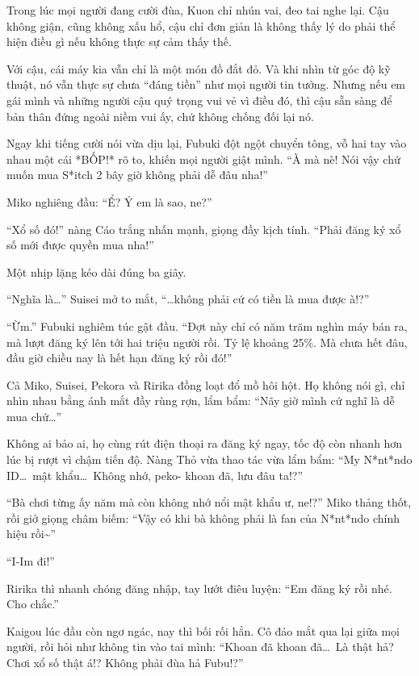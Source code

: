 \documentclass[../main.tex]{subfiles}
\begin{document}
Trong lúc mọi người đang cười đùa, Kuon chỉ nhún vai, đeo tai nghe lại. Cậu không giận, cũng không xấu hổ, cậu chỉ đơn giản là không thấy lý do phải thể hiện điều gì nếu không thực sự cảm thấy thế.

Với cậu, cái máy kia vẫn chỉ là một món đồ đắt đỏ. Và khi nhìn từ góc độ kỹ thuật, nó vẫn thực sự chưa ``đáng tiền'' như mọi người tin tưởng. Nhưng nếu em gái mình và những người cậu quý trọng vui vẻ vì điều đó, thì cậu sẵn sàng để bản thân đứng ngoài niềm vui ấy, chứ không chống đối lại nó.

Ngay khi tiếng cười nói vừa dịu lại, Fubuki đột ngột chuyển tông, vỗ hai tay vào nhau một cái *BỐP!* rõ to, khiến mọi người giật mình. ``À mà nè! Nói vậy chứ muốn mua S*itch 2 bây giờ không phải dễ đâu nha!''

Miko nghiêng đầu: ``Ể? Ý em là sao, ne?''

``Xổ số đó!'' nàng Cáo trắng nhấn mạnh, giọng đầy kịch tính. ``Phải đăng ký xổ số mới được quyền mua nha!''

Một nhịp lặng kéo dài đúng ba giây.

``Nghĩa là\dots'' Suisei mở to mắt, ``\dots không phải cứ có tiền là mua được à!?''

``Ừm.'' Fubuki nghiêm túc gật đầu. ``Đợt này chỉ có năm trăm nghìn máy bán ra, mà lượt đăng ký lên tới hai triệu người rồi. Tỷ lệ khoảng 25\%. Mà chưa hết đâu, đầu giờ chiều nay là hết hạn đăng ký rồi đó!''

Cả Miko, Suisei, Pekora và Ririka đồng loạt đổ mồ hôi hột. Họ không nói gì, chỉ nhìn nhau bằng ánh mắt đầy rùng rợn, lẩm bẩm: ``Nãy giờ mình cứ nghĩ là dễ mua chứ\dots''

Không ai bảo ai, họ cùng rút điện thoại ra đăng ký ngay, tốc độ còn nhanh hơn lúc bị rượt vì chậm tiến độ. Nàng Thỏ vừa thao tác vừa lẩm bẩm: ``My N*nt*ndo ID\dots\ mật khẩu\dots\ Không nhớ, peko- khoan đã, lưu đâu ta!?''

``Bà chơi từng ấy năm mà còn không nhớ nổi mật khẩu ư, ne!?'' Miko thảng thốt, rồi giở giọng châm biếm: ``Vậy có khi bà không phải là fan của N*nt*ndo chính hiệu rồi\~{}''

``I-Im đi!''

Ririka thì nhanh chóng đăng nhập, tay lướt điêu luyện: ``Em đăng ký rồi nhé. Cho chắc.''

Kaigou lúc đầu còn ngơ ngác, nay thì bối rối hẳn. Cô đảo mắt qua lại giữa mọi người, rồi hỏi như không tin vào tai mình: ``Khoan đã khoan đã\dots\ Là thật hả? Chơi xổ số thật á!? Không phải đùa hả Fubu!?''
\end{document}
